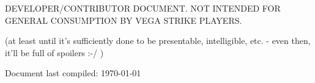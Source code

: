\vspace{1cm}
\centerline{\LARGE DEVELOPER/CONTRIBUTOR DOCUMENT. NOT INTENDED FOR GENERAL CONSUMPTION BY VEGA STRIKE PLAYERS.}
\vspace{0.5cm}
\centerline{(at least until it's sufficiently done to be presentable, intelligible, etc. - even then, it'll be full of spoilers :-/ )}
\vspace{3cm}
\centerline{Document last compiled: \today}

